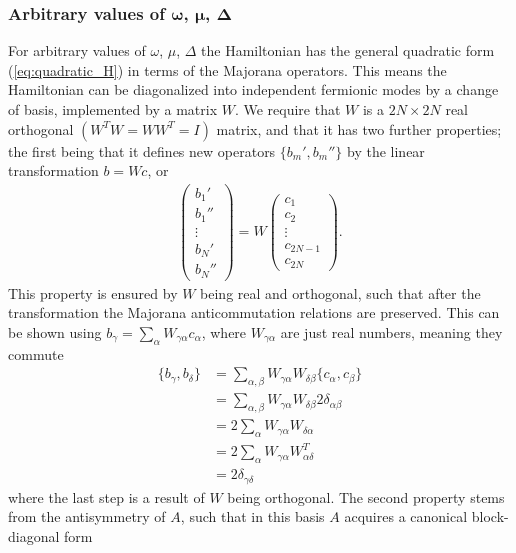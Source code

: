 \subsubsection{Arbitrary values of $\boldsymbol{\omega}$, $\boldsymbol{\mu}$, $\boldsymbol{\Delta}$}
For arbitrary values of $\omega$, $\mu$, $\Delta$ the Hamiltonian has the general quadratic form (\ref{eq:quadratic_H}) in terms of the Majorana operators. This means the Hamiltonian can be diagonalized into independent fermionic modes by a change of basis, implemented by a matrix $W$. We require that $W$ is a $2N \times 2N$ real orthogonal $(W^T W = W W^T = I)$ matrix, and that it has two further properties; the first being that it defines new operators $\{b_m', b_m''\} $ by the linear transformation $b = Wc$, or
\begin{align}
    \begin{pmatrix}
        b_1'\\
        b_1''\\
        \vdots\\
        b_N'\\
        b_N''
    \end{pmatrix} = W \begin{pmatrix}
        c_1 \\
        c_2\\
        \vdots\\
        c_{2N-1}\\
        c_{2N}
    \end{pmatrix}.
\end{align}
This property is ensured by $W$ being real and orthogonal, such that after the transformation the Majorana anticommutation relations are preserved. This can be shown using $b_\gamma = \sum_\alpha W_{\gamma \alpha} c_\alpha$, where $W_{\gamma \alpha}$ are just real numbers, meaning they commute
\begin{align}
    \{b_\gamma, b_\delta\} &= \sum_{\alpha, \beta} W_{\gamma \alpha} W_{\delta \beta} \{c_\alpha, c_\beta\} \\
    &= \sum_{\alpha, \beta} W_{\gamma \alpha} W_{\delta \beta} 2 \delta_{\alpha \beta} \\
    &= 2 \sum_{\alpha} W_{\gamma \alpha} W_{\delta \alpha}\\
    &= 2 \sum_\alpha W_{\gamma \alpha} W^T_{\alpha \delta} \\
    &= 2 \delta_{\gamma \delta} 
\end{align}
where the last step is a result of $W$ being orthogonal. The second property stems from the antisymmetry of $A$, such that in this basis $A$ acquires a canonical block-diagonal form
